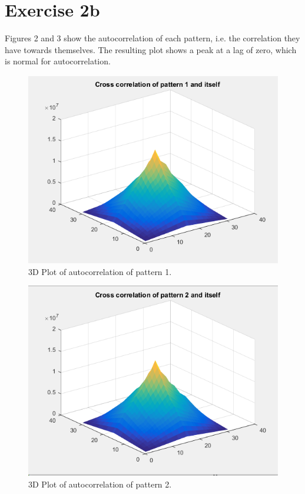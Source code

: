 \documentclass[12pt, a4paper]{article}
\begin{document}
	\part*{Exercise 2b}
	Figures 2 and 3 show the autocorrelation of each pattern, i.e. the correlation they have towards themselves. The resulting plot shows a peak at a lag of zero, which is normal for autocorrelation.
	\begin{figure}[bp!]
		\caption{3D Plot of autocorrelation of pattern 1.}
		\centering
		\includegraphics[width=\textwidth]{pictures/2b_pattern1}
	\end{figure}
	\begin{figure}[bp!]
		\caption{3D Plot of autocorrelation of pattern 2.}
		\centering
		\includegraphics[width=\textwidth]{pictures/2b_pattern2}
	\end{figure}
	\newpage
\end{document}
